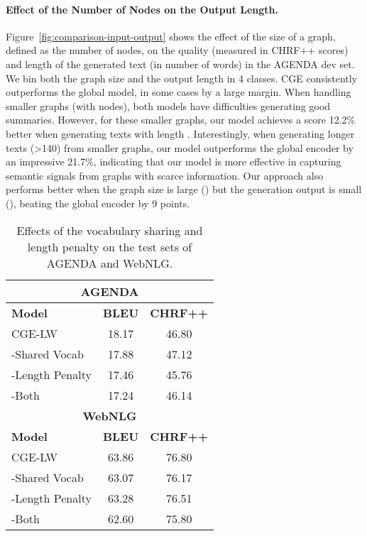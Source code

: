 \documentclass[11pt,a4paper]{article}
\begin{document}
\paragraph{Effect of the Number of Nodes on the Output Length.}
\label{sec:relations_input_output}
Figure~\ref{fig:comparison-input-output} shows the effect of the size of a graph, defined as the number of nodes, on the quality (measured in CHRF++ scores) and length of the generated text (in number of words) in the AGENDA dev set. We bin both the graph size and the output length in 4 classes. {\selectfont CGE} consistently outperforms the global model, in some cases by a large margin. When handling smaller graphs (with  nodes), both models have difficulties generating good summaries. However, for these smaller graphs, our model achieves a score 12.2\% better when generating texts with length . Interestingly, when generating longer texts (>140) from smaller graphs, our model outperforms the global encoder by an impressive 21.7\%, indicating that our model is more effective in capturing semantic signals from graphs with scarce information. Our approach also performs better when the graph size is large () but the generation output is small (), beating the global encoder by 9 points.

\begin{table}[t]
\centering
{\renewcommand{\arraystretch}{0.8}
\setlength{\belowrulesep}{1.3pt}
\setlength{\aboverulesep}{0pt}
\begin{tabular}{@{\hspace*{5mm}}lcc@{\hspace*{5mm}}}  
\toprule
\multicolumn{3}{c}{\textbf{AGENDA}}  \\
\midrule
\textbf{Model} & \textbf{BLEU} & \textbf{CHRF++}  \\
\midrule
CGE-LW & 18.17 & 46.80 \\
 -Shared Vocab & 17.88 & 47.12 \\
 -Length Penalty & 17.46 & 45.76 \\
 -Both & 17.24 & 46.14 \\
 \midrule
\multicolumn{3}{c}{\textbf{WebNLG}}  \\
\midrule
\textbf{Model} & \textbf{BLEU} & \textbf{CHRF++}  \\
\midrule
CGE-LW & 63.86 & 76.80 \\
 -Shared Vocab & 63.07 & 76.17 \\
 -Length Penalty & 63.28 & 76.51 \\
 -Both & 62.60 & 75.80 \\
\bottomrule
\end{tabular}}
\vspace{-1.7mm}
\caption{Effects of the vocabulary sharing and length penalty on the test sets of AGENDA and WebNLG.}
\label{tab:ablation-test}
\end{table}
\end{document}
